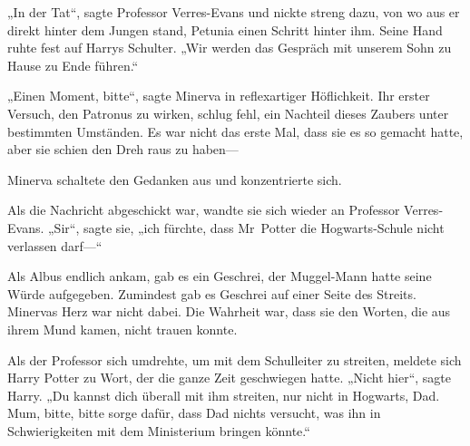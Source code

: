„In der Tat“, sagte Professor Verres-Evans und nickte streng dazu, von wo aus er direkt hinter dem Jungen stand, Petunia einen Schritt hinter ihm. Seine Hand ruhte fest auf Harrys Schulter. „Wir werden das Gespräch mit unserem Sohn zu Hause zu Ende führen.“

„Einen Moment, bitte“, sagte Minerva in reflexartiger Höflichkeit. Ihr erster Versuch, den Patronus zu wirken, schlug fehl, ein Nachteil dieses Zaubers unter bestimmten Umständen. Es war nicht das erste Mal, dass sie es so gemacht hatte, aber sie schien den Dreh raus zu haben—

Minerva schaltete den Gedanken aus und konzentrierte sich.

Als die Nachricht abgeschickt war, wandte sie sich wieder an Professor Verres-Evans. „Sir“, sagte sie, „ich fürchte, dass Mr~Potter die Hogwarts-Schule nicht verlassen darf—“

Als Albus endlich ankam, gab es ein Geschrei, der Muggel-Mann hatte seine Würde aufgegeben. Zumindest gab es Geschrei auf einer Seite des Streits. Minervas Herz war nicht dabei. Die Wahrheit war, dass sie den Worten, die aus ihrem Mund kamen, nicht trauen konnte.

Als der Professor sich umdrehte, um mit dem Schulleiter zu streiten, meldete sich Harry Potter zu Wort, der die ganze Zeit geschwiegen hatte. „Nicht hier“, sagte Harry. „Du kannst dich überall mit ihm streiten, nur nicht in Hogwarts, Dad. Mum, bitte, bitte sorge dafür, dass Dad nichts versucht, was ihn in Schwierigkeiten mit dem Ministerium bringen könnte.“


